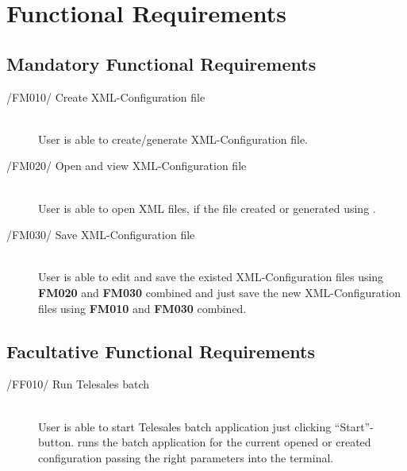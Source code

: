 \section{Functional Requirements}

\subsection{Mandatory Functional Requirements}
\begin{description}
\item[/FM010/ Create XML-Configuration file]\hfill\\ User is able to create/generate XML-Configuration file.
\item[/FM020/ Open and view XML-Configuration file]\hfill\\ User is able to open XML files, if the file created or generated using \app{}.
\item[/FM030/ Save XML-Configuration file]\hfill\\ User is able to edit and save the existed XML-Configuration files using \textbf{FM020} and \textbf{FM030} combined and just save the new XML-Configuration files using \textbf{FM010} and \textbf{FM030} combined.
\end{description}

\subsection{Facultative Functional Requirements}
\begin{description}
\item[/FF010/ Run Telesales batch]\hfill\\ User is able to start Telesales batch application just clicking ``Start''-button. \app{} runs the batch application for the current opened or created configuration passing the right parameters into the terminal.
\end{description}
